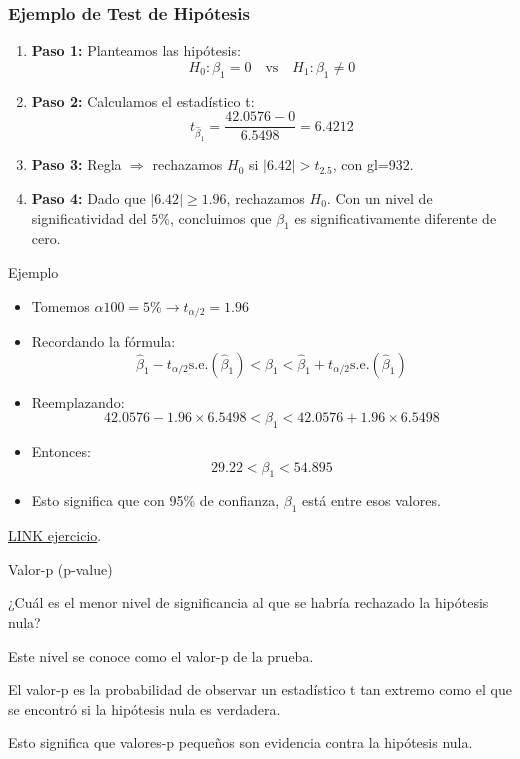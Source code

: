 \documentclass{beamer}
\begin{document}
\begin{frame}
\frametitle{Ejemplo de Test de Hipótesis}


\begin{enumerate}
    \item \textbf{Paso 1:} Planteamos las hipótesis:
    \[
    H_0 : \beta_1 = 0 \quad \text{vs} \quad H_1 : \beta_1 \neq 0
    \]

    \item \textbf{Paso 2:} Calculamos el estadístico t:
    \[
    t_{\hat{\beta}_1} = \frac{42.0576 - 0}{6.5498} = 6.4212
    \]

    \item \textbf{Paso 3:} Regla $\Rightarrow$ rechazamos $H_0$ si $|6.42| > t_{2.5}$, con gl=932.

    \item \textbf{Paso 4:} Dado que $|6.42| \geq 1.96$, rechazamos $H_0$. Con un nivel de significatividad del $5\%$, concluimos que $\beta_1$ es significativamente diferente de cero.
\end{enumerate}
\end{frame}
\begin{frame}[shrink=10]{Ejemplo}


    \begin{itemize}
        \item Tomemos $\alpha 100 = 5\% \rightarrow t_{\alpha/2} =  1.96$
        \item Recordando la fórmula:
        \[
        \hat{\beta}_1 - t_{\alpha/2} \text{s.e.}(\hat{\beta}_1) < \beta_1 < \hat{\beta}_1 + t_{\alpha/2} \text{s.e.}(\hat{\beta}_1)
        \]
        \item Reemplazando:
        \[
        42.0576 - 1.96 \times 6.5498 < \beta_1 < 42.0576 + 1.96 \times 6.5498
        \]
        \item Entonces:
        \[
        29.22 < \beta_1 < 54.895
        \]
        \item Esto significa que con 95\% de confianza, $\beta_1$ está entre esos valores.
    \end{itemize}

 \href{https://colab.research.google.com/drive/1ofQHrMDZSBYgfbw7JEjXtWvevykkMNX_?usp=sharing\#scrollTo=9Fdx9GNkxGIF}{LINK ejercicio}.
\end{frame}


\begin{frame}{Valor-p (p-value)}


    ¿Cuál es el menor nivel de
significancia al que se habría rechazado la hipótesis nula?

{\color{blue}Este nivel se conoce como el valor-p
de la prueba.}

El valor-p es la probabilidad de observar un
estadístico t tan extremo como el que se encontró si la hipótesis nula es verdadera.

Esto significa
que valores-p pequeños son evidencia contra la hipótesis nula.



\end{frame}
\end{document}

